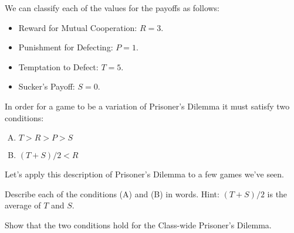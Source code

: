 We can classify each of the values for the payoffs as follows:
\begin{itemize}
\item  Reward for Mutual Cooperation: $R=3.$
\item Punishment for Defecting: $P=1.$
\item Temptation to Defect: $T=5.$
\item Sucker's Payoff: $S=0.$
\end{itemize}

In order for a game to be a variation of Prisoner's Dilemma it must satisfy two conditions:
\begin{enumerate}[(A)]
\item $T>R>P>S$
\item $(T+S)/2 < R$
\end{enumerate}

Let's apply this description of Prisoner's Dilemma to a few games we've seen.


\begin{xca}\label{E:describeconditions}
Describe each of the conditions (A) and (B) in words. Hint: $(T+S)/2$ is the average of $T$ and $S$.
\end{xca}

\begin{xca}\label{E:CWPDshow}
Show that the two conditions hold for the Class-wide Prisoner's Dilemma.
\end{xca}

